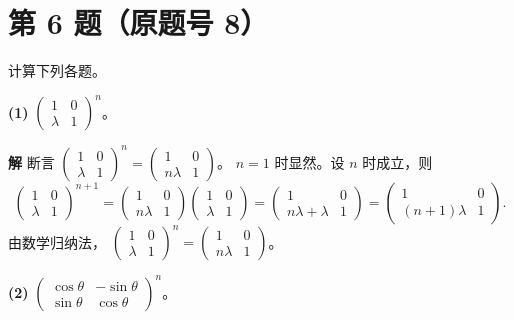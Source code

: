 \documentclass[11pt,a4paper]{ctexart}
\newenvironment{problem}[1]
  {\par\medskip\noindent\textbf{#1}\quad}
  {\par}
\newenvironment{solution}
  {\par\noindent\textbf{解}\quad}
  {\par}
\begin{document}
\section*{第 6 题（原题号 8）}

\begin{problem}{}计算下列各题。\end{problem}

\textbf{(1)} $\begin{pmatrix}1&0\\\lambda&1\end{pmatrix}^n$。

\begin{solution}
断言 $\begin{pmatrix}1&0\\\lambda&1\end{pmatrix}^n=\begin{pmatrix}1&0\\n\lambda&1\end{pmatrix}$。
$n=1$ 时显然。设 $n$ 时成立，则
\[
\begin{pmatrix}1&0\\\lambda&1\end{pmatrix}^{n+1}
=\begin{pmatrix}1&0\\n\lambda&1\end{pmatrix}\begin{pmatrix}1&0\\\lambda&1\end{pmatrix}
=\begin{pmatrix}1&0\\n\lambda+\lambda&1\end{pmatrix}
=\begin{pmatrix}1&0\\(n+1)\lambda&1\end{pmatrix}.
\]
由数学归纳法，
$\begin{pmatrix}1&0\\\lambda&1\end{pmatrix}^n=\begin{pmatrix}1&0\\n\lambda&1\end{pmatrix}$。
\end{solution}

\textbf{(2)} $\begin{pmatrix}\cos\theta&-\sin\theta\\\sin\theta&\cos\theta\end{pmatrix}^n$。
\end{document}
